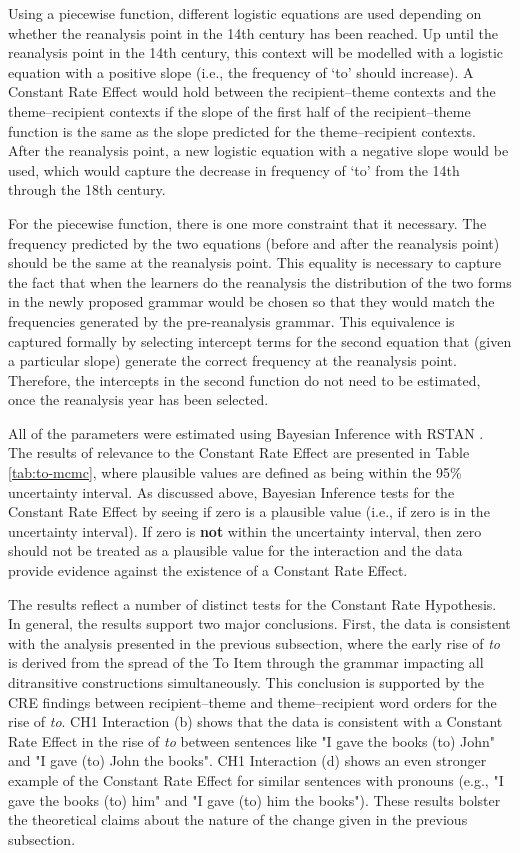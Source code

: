 	Using a piecewise function, different logistic equations are used depending on whether the reanalysis point in the 14th century has been reached. Up until the reanalysis point in the 14th century, this context will be modelled with a logistic equation with a positive slope (i.e., the frequency of `to' should increase). A Constant Rate Effect would hold between the recipient--theme contexts and the theme--recipient contexts if the slope of the first half of the recipient--theme function is the same as the slope predicted for the theme--recipient contexts. After the reanalysis point, a new logistic equation with a negative slope would be used, which would capture the decrease in frequency of `to' from the 14th through the 18th century.

	For the piecewise function, there is one more constraint that it necessary. The frequency predicted by the two equations (before and after the reanalysis point) should be the same at the reanalysis point. This equality is necessary to capture the fact that when the learners do the reanalysis the distribution of the two forms in the newly proposed grammar would be chosen so that they would match the frequencies generated by the pre-reanalysis grammar. This equivalence is captured formally by selecting intercept terms for the second equation that (given a particular slope) generate the correct frequency at the reanalysis point. Therefore, the intercepts in the second function do not need to be estimated, once the reanalysis year has been selected.

	All of the parameters were estimated using Bayesian Inference with RSTAN \citep{stan.2016}. The results of relevance to the Constant Rate Effect are presented in Table \ref{tab:to-mcmc}, where plausible values are defined as being within the 95\% uncertainty interval. As discussed above, Bayesian Inference tests for the Constant Rate Effect by seeing if zero is a plausible value (i.e., if zero is in the uncertainty interval). If zero is \textbf{not} within the uncertainty interval, then zero should not be treated as a plausible value for the interaction and the data provide evidence against the existence of a Constant Rate Effect.



   The results reflect a number of distinct tests for the Constant Rate Hypothesis. In general, the results support two major conclusions. First, the data is consistent with the analysis presented in the previous subsection, where the early rise of \textit{to} is derived from the spread of the To Item through the grammar impacting all ditransitive constructions simultaneously. This conclusion is supported by the CRE findings between recipient--theme and theme--recipient word orders for the rise of \textit{to}. CH1 Interaction (b) shows that the data is consistent with a Constant Rate Effect in the rise of \textit{to} between sentences like "I gave the books (to) John" and "I gave (to) John the books". CH1 Interaction (d) shows an even stronger example of the Constant Rate Effect for similar sentences with pronouns (e.g., "I gave the books (to) him" and "I gave (to) him the books"). These results bolster the theoretical claims about the nature of the change given in the previous subsection.

